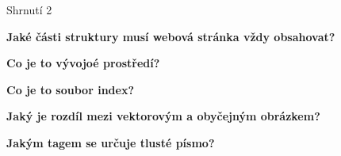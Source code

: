 \documentclass[aspectratio=1610]{beamer}
\begin{document}
\begin{frame}{Shrnutí 2}
    \begin{cardTiny}
        \begin{center}
            \textbf{Jaké části struktury musí webová stránka vždy obsahovat?}
        \end{center}
    \end{cardTiny}
    \begin{cardTiny}
        \begin{center}
            \textbf{Co je to vývojoé prostředí?}
        \end{center}
    \end{cardTiny}
    \begin{cardTiny}
        \begin{center}
            \textbf{Co je to soubor index?}
        \end{center}
    \end{cardTiny}
    \begin{cardTiny}
        \begin{center}
            \textbf{Jaký je rozdíl mezi vektorovým a obyčejným obrázkem?}
        \end{center}
    \end{cardTiny}
    \begin{cardTiny}
        \begin{center}
            \textbf{Jakým tagem se určuje tlusté písmo?}
        \end{center}
    \end{cardTiny}
\end{frame}
\end{document}
